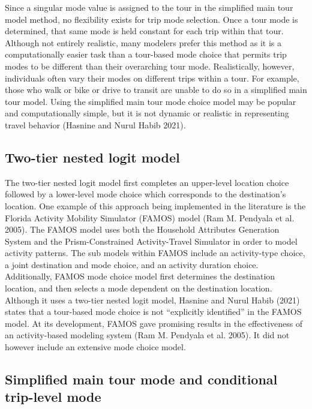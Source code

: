 \documentclass[12pt, oneside, openright]{byuthesis}
\begin{document}
Since a singular mode value is assigned to the tour in the simplified main tour model method, no flexibility exists for trip mode selection. Once a tour mode is determined, that same mode is held constant for each trip within that tour. Although not entirely realistic, many modelers prefer this method as it is a computationally easier task than a tour-based mode choice that permits trip modes to be different than their overarching tour mode. Realistically, however, individuals often vary their modes on different trips within a tour. For example, those who walk or bike or drive to transit are unable to do so in a simplified main tour model. Using the simplified main tour mode choice model may be popular and computationally simple, but it is not dynamic or realistic in representing travel behavior (Hasnine and Nurul Habib 2021).

\hypertarget{lit32}{%
\subsection{Two-tier nested logit model}\label{lit32}}

The two-tier nested logit model first completes an upper-level location choice followed by a lower-level mode choice which corresponds to the destination's location. One example of this approach being implemented in the literature is the Florida Activity Mobility Simulator (FAMOS) model (Ram M. Pendyala et al. 2005). The FAMOS model uses both the Household Attributes Generation System and the Prism-Constrained Activity-Travel Simulator in order to model activity patterns. The sub models within FAMOS include an activity-type choice, a joint destination and mode choice, and an activity duration choice. Additionally, FAMOS mode choice model first determines the destination location, and then selects a mode dependent on the destination location. Although it uses a two-tier nested logit model, Hasnine and Nurul Habib (2021) states that a tour-based mode choice is not ``explicitly identified'' in the FAMOS model. At its development, FAMOS gave promising results in the effectiveness of an activity-based modeling system (Ram M. Pendyala et al. 2005). It did not however include an extensive mode choice model.

\hypertarget{lit33}{%
\subsection{Simplified main tour mode and conditional trip-level mode}\label{lit33}}
\end{document}
